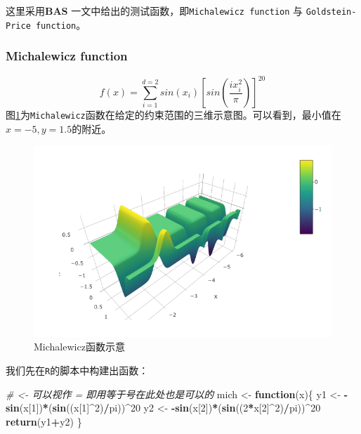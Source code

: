 \documentclass[]{ctexbook}
\newenvironment{Shaded}{\begin{snugshade}}{\end{snugshade}}
\newcommand{\KeywordTok}[1]{\textcolor[rgb]{0.13,0.29,0.53}{\textbf{#1}}}
\newcommand{\DecValTok}[1]{\textcolor[rgb]{0.00,0.00,0.81}{#1}}
\newcommand{\StringTok}[1]{\textcolor[rgb]{0.31,0.60,0.02}{#1}}
\newcommand{\CommentTok}[1]{\textcolor[rgb]{0.56,0.35,0.01}{\textit{#1}}}
\newcommand{\ControlFlowTok}[1]{\textcolor[rgb]{0.13,0.29,0.53}{\textbf{#1}}}
\newcommand{\OperatorTok}[1]{\textcolor[rgb]{0.81,0.36,0.00}{\textbf{#1}}}
\newcommand{\NormalTok}[1]{#1}
\theoremstyle{definition}
\theoremstyle{definition}
\theoremstyle{definition}
\theoremstyle{remark}
\begin{document}
这里采用\textbf{BAS}
\citep{Jiang2017BAS}一文中给出的测试函数，即\texttt{Michalewicz\ function}
与 \texttt{Goldstein-Price\ function}。

\subsubsection{Michalewicz function}\label{BASmich}

\[
f(x)=\sum_{i=1}^{d=2}sin(x_i)[sin(\frac{ix_i^2}{\pi})]^{20}
\]
图\ref{fig:mich}为\texttt{Michalewicz}函数在给定的约束范围的三维示意图。可以看到，最小值在\(x = -5,y = 1.5\)的附近。

\begin{figure}

{\centering \includegraphics[width=0.8\linewidth]{img/mich} 

}

\caption{ Michalewicz函数示意}\label{fig:mich}
\end{figure}

我们先在\texttt{R}的脚本中构建出函数：

\begin{Shaded}
\begin{Highlighting}[]
\CommentTok{# <- 可以视作 = 即用等于号在此处也是可以的 }
\NormalTok{mich <-}\StringTok{ }\ControlFlowTok{function}\NormalTok{(x)\{}
\NormalTok{  y1 <-}\StringTok{ }\OperatorTok{-}\KeywordTok{sin}\NormalTok{(x[}\DecValTok{1}\NormalTok{])}\OperatorTok{*}\NormalTok{(}\KeywordTok{sin}\NormalTok{((x[}\DecValTok{1}\NormalTok{]}\OperatorTok{^}\DecValTok{2}\NormalTok{)}\OperatorTok{/}\NormalTok{pi))}\OperatorTok{^}\DecValTok{20}
\NormalTok{  y2 <-}\StringTok{ }\OperatorTok{-}\KeywordTok{sin}\NormalTok{(x[}\DecValTok{2}\NormalTok{])}\OperatorTok{*}\NormalTok{(}\KeywordTok{sin}\NormalTok{((}\DecValTok{2}\OperatorTok{*}\NormalTok{x[}\DecValTok{2}\NormalTok{]}\OperatorTok{^}\DecValTok{2}\NormalTok{)}\OperatorTok{/}\NormalTok{pi))}\OperatorTok{^}\DecValTok{20}
  \KeywordTok{return}\NormalTok{(y1}\OperatorTok{+}\NormalTok{y2)}
\NormalTok{\}}
\end{Highlighting}
\end{Shaded}
\end{document}

